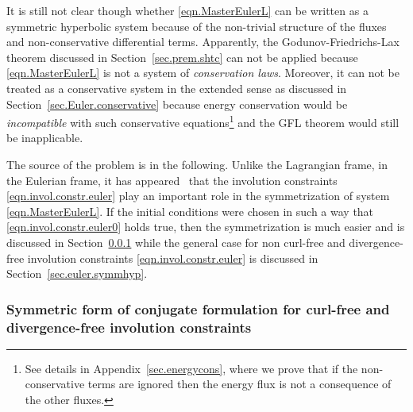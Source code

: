\documentclass[twoside]{article}
\begin{document}
It is still not clear though whether \eqref{eqn.MasterEulerL} can be written as a 
symmetric 
hyperbolic 
system because of the non-trivial structure of the fluxes and non-conservative 
differential terms. Apparently, the Godunov-Friedrichs-Lax theorem discussed in 
Section~\ref{sec.prem.shtc} can not be applied because \eqref{eqn.MasterEulerL} 
is not a system of \textit{conservation laws}. Moreover, it can not be treated 
as a conservative system in the extended sense as discussed in 
Section~\ref{sec.Euler.conservative} because  energy 
conservation would be \textit{incompatible} with such conservative 
equations\footnote{See details in Appendix~\ref{sec.energycons}, where we prove 
that if the non-conservative terms are ignored then the energy flux is not a 
consequence of the other fluxes.} and 
 the GFL theorem would still be inapplicable.


The source of the problem is in the following. Unlike the 
Lagrangian frame, in the Eulerian frame, it has 
appeared~\cite{God1972,Godunov1996,Rom1998,Rom2001} that the involution 
constraints \eqref{eqn.invol.constr.euler} play an important role in the 
symmetrization of system \eqref{eqn.MasterEulerL}. If the initial conditions 
were chosen in such a way that 
\eqref{eqn.invol.constr.euler0} holds true, then the symmetrization is much 
easier and is discussed in Section~\ref{sec.euler.symmhyp0} while the general 
case for non curl-free and divergence-free involution constraints 
\eqref{eqn.invol.constr.euler} is discussed in Section~\ref{sec.euler.symmhyp}.



\subsubsection{Symmetric form of conjugate formulation for curl-free 
and divergence-free involution constraints}\label{sec.euler.symmhyp0}
\end{document}
